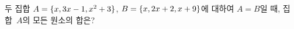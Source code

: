 두 집합 $A=\{x{,}\mkern3mu\mathopen{}3x-1{,}\mkern3mu\mathopen{}x^2+3\}$, $B=\{x{,}\mkern3mu\mathopen{}2x+2{,}\mkern3mu\mathopen{}x+9\}$에 대하여 $A=B$일 때, 집합~$A$의 모든 원소의 합은?
